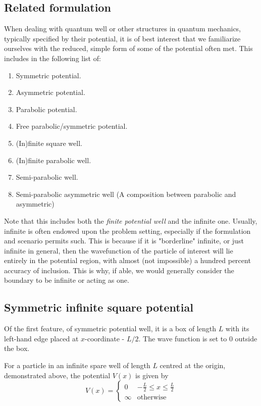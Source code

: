 \subsection{Related formulation}
When dealing with quantum well or other structures in quantum mechanics, typically specified by their potential, it is of best interest that we familiarize ourselves with the reduced, simple form of some of the potential often met. This includes in the following list of: 
\begin{enumerate}[topsep=1pt,itemsep=0.5pt]
	\item Symmetric potential. 
	\item Asymmetric potential. 
	\item Parabolic potential. 
	\item Free parabolic/symmetric potential. 
	\item (In)finite square well. 
	\item (In)finite parabolic well. 
	\item Semi-parabolic well. 
	\item Semi-parabolic asymmetric well (A composition between parabolic and asymmetric)
\end{enumerate}
Note that this includes both the \textit{finite potential well} and the infinite one. Usually, infinite is often endowed upon the problem setting, especially if the formulation and scenario permits such. This is because if it is "borderline" infinite, or just infinite in general, then the wavefunction of the particle of interest will lie entirely in the potential region, with almost (not impossible) a hundred percent accuracy of inclusion. This is why, if able, we would generally consider the boundary to be infinite or acting as one. 
\subsection{Symmetric infinite square potential}

Of the first feature, of symmetric potential well, it is a box of length $L$ with its left-hand edge placed at $x$-coordinate - $L/2$. The wave function is set to 0 outside the box.

For a particle in an infinite spare well of length $L$ centred at the origin, demonstrated above, the potential $V(x)$ is given by 
\begin{equation}
	V(x)=\begin{cases}
	0 & -\frac{L}{2} \le x \le \frac{L}{2} \\ 
	\infty& \text{otherwise}
	\end{cases} 
\end{equation}

